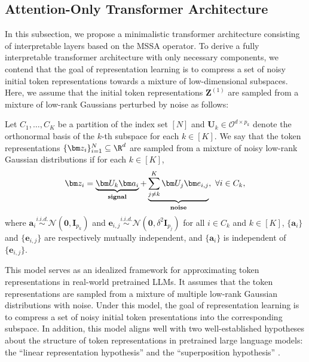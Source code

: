 \documentclass[../../book-main.tex]{subfiles}
\begin{document}
\subsection{Attention-Only Transformer Architecture} \label{sub:aot}

In this subsection, we propose a minimalistic transformer architecture consisting of interpretable layers based on the MSSA operator. To derive a fully interpretable transformer architecture with only necessary components,
we contend that the goal of representation learning is to compress a set of noisy initial token representations towards a mixture of low-dimensional subspaces. %
Here, we assume that the initial token representations $\bm Z^{(1)}$ are sampled from a mixture of low-rank Gaussians perturbed by noise as follows: 
\begin{definition}\label{def:MoG}
Let $C_1,\dots,C_K$ be a partition of the index set $[N]$ and $\bm U_k \in \mathcal{O}^{d \times p_k}$ denote the orthonormal basis of the $k$-th subspace for each $k \in [K]$. We say that the token representations $\{\bm z_i \}_{i=1}^N \subseteq \R^d$ are sampled from a mixture of noisy low-rank Gaussian distributions if for each $k \in [K]$,
\begin{align}\label{eq:MoG}
    \bm z_i = \underbrace{\bm U_{k} \bm a_i}_{\bf signal} + \underbrace{\sum_{j \neq k}^K \bm U_j \bm e_{i,j}}_{\bf noise},\ \forall i \in C_k, 
\end{align}
where $\bm{a}_i \overset{i.i.d.}{\sim} \mathcal{N}(\bm{0},\bm{I}_{p_k})$ and $\bm{e}_{i,j} \overset{i.i.d.}{\sim} \mathcal{N}(\bm{0},\delta^2\bm{I}_{p_j})$ for all $i \in C_k$ and $k \in [K]$, $\{\bm{a}_i\}$ and $\{\bm{e}_{i,j}\}$ are respectively mutually independent, and $\{\bm{a}_i\}$ is independent of $\{\bm{e}_{i,j}\}$.         
\end{definition}
This model serves as an idealized framework for approximating token representations in real-world pretrained LLMs. It assumes that the token representations are sampled from a mixture of multiple low-rank Gaussian distributions with noise. Under this model, the goal of representation learning is to compress a set of noisy initial token presentations into the corresponding subspace. In addition, this model aligns well with two well-established hypotheses about the structure of token representations in pretrained large language models: the ``linear representation hypothesis''  \citep{jiang2024origins,park2023linear} and the ``superposition hypothesis'' \citep{elhage2022toy,yun2021transformer}. 
\end{document}

